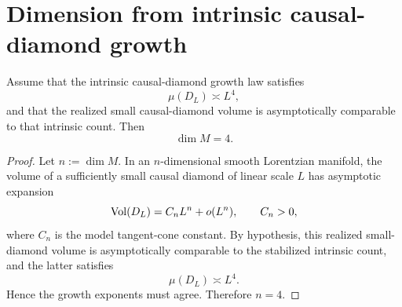 \section{Dimension from intrinsic causal-diamond growth}
\label{sec:einstein-dim}
\begin{theorem}
	\label{thm:einstein-dim}
	Assume that the intrinsic causal-diamond growth law satisfies
	\[
		\mu(D_L)\asymp L^4,
	\]
	and that the realized small causal-diamond volume is asymptotically
	comparable to that intrinsic count.
	Then
	\[
		\dim M=4.
	\]
\end{theorem}
\begin{proof}
	Let \(n:=\dim M\).
	In an \(n\)-dimensional smooth Lorentzian manifold, the volume of a
	sufficiently small causal diamond of linear scale \(L\) has asymptotic
	expansion
	\[
		\operatorname{Vol}(D_L)=C_nL^n+o(L^n),
		\qquad
		C_n>0,
	\]
	where \(C_n\) is the model tangent-cone constant.
	By hypothesis, this realized small-diamond volume is asymptotically
	comparable to the stabilized intrinsic count, and the latter satisfies
	\[
		\mu(D_L)\asymp L^4.
	\]
	Hence the growth exponents must agree.
	Therefore \(n=4\).
\end{proof}
